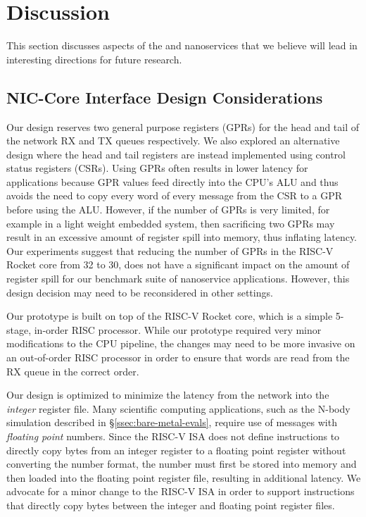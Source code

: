 \section{Discussion}
This section discusses aspects of the \name{} and nanoservices that we believe will lead in interesting directions for future research.

\subsection{\name{} NIC-Core Interface Design Considerations}

Our \name{} design reserves two general purpose registers (GPRs) for the head and tail of the network RX and TX queues respectively.
We also explored an alternative design where the head and tail registers are instead implemented using control status registers (CSRs).
Using GPRs often results in lower latency for applications because GPR values feed directly into the CPU's ALU and thus avoids the need to copy every word of every message from the CSR to a GPR before using the ALU.
However, if the number of GPRs is very limited, for example in a light weight embedded system, then sacrificing two GPRs may result in an excessive amount of register spill into memory, thus inflating latency.
Our experiments suggest that reducing the number of GPRs in the RISC-V Rocket core from 32 to 30, does not have a significant impact on the amount of register spill for our benchmark suite of nanoservice applications.
However, this design decision may need to be reconsidered in other settings.

Our \name{} prototype is built on top of the RISC-V Rocket core, which is a simple 5-stage, in-order RISC processor.
While our prototype required very minor modifications to the CPU pipeline, the changes may need to be more invasive on an out-of-order RISC processor in order to ensure that words are read from the RX queue in the correct order.

Our \name{} design is optimized to minimize the latency from the network into the \emph{integer} register file.
Many scientific computing applications, such as the N-body simulation described in \S\ref{ssec:bare-metal-evals}, require use of messages with \emph{floating point} numbers.
Since the RISC-V ISA does not define instructions to directly copy bytes from an integer register to a floating point register without converting the number format, the number must first be stored into memory and then loaded into the floating point register file, resulting in additional latency.
We advocate for a minor change to the RISC-V ISA in order to support instructions that directly copy bytes between the integer and floating point register files.

